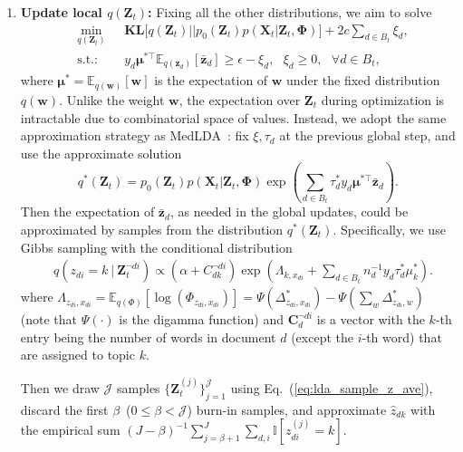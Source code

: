 \documentclass[twoside,11pt]{article}
\newcommand{\Xv}{\bm{X}}
\newcommand{\zv}{\bm{z}}
\newcommand{\Zv}{\bm{Z}}
\newcommand{\wv}{\bm{w}}
\newcommand{\Phiv}{\bm{\Phi}}
\newcommand{\muv}{\bm \mu}
\newcommand{\ep}{\mathbb{E}}
\newcommand{\KL}{\textbf{KL}}
\newcommand{\barzv}{\bm{\bar{z}}}
\newcommand{\subto}{\text{s.t.:}}
\newcommand{\ind}{\mathbb{I}}
\newcommand\refeq[1]{(\ref{#1})}
\begin{document}
\begin{enumerate}
\item \textbf{Update local $q(\Zv_t)$:} Fixing all the other distributions, we aim to solve
\setlength\arraycolsep{0 pt}\begin{eqnarray*}
&\underset{q(\Zv_t)}{\operatorname{min}}~~~ & \KL\Big[q(\Zv_t) || p_0(\Zv_t) p(\Xv_t | \Zv_t, \Phiv)\Big] + 2c \sum\limits_{d \in B_t}{\xi_d}, \\
&\subto & y_d \muv^{*\top} \ep_{q(\zv_d)}[\barzv_d] \geq \epsilon-\xi_d, ~~~ \xi_d \geq 0, ~~~\forall d \in B_t,
\end{eqnarray*}
where $\muv^* = \ep_{q(\wv)}[\wv]$ is the expectation of $\wv$ under the fixed distribution $q(\wv)$. Unlike the weight $\wv$, the expectation over $\Zv_t$ during optimization is intractable due to combinatorial space of values. Instead, we adopt the same approximation strategy as MedLDA~\citep{zhu2012medlda}: fix $\xi, \tau_d$ at the previous global step, and use the approximate solution
\begin{equation*}
q^*(\Zv_t) = p_0(\Zv_t) p(\Xv_t | \Zv_t, \Phiv) \exp\left( \sum\limits_{d \in B_t}{\tau_d^* y_d \muv^{*\top} \barzv_d} \right).
\end{equation*}
Then the expectation of $\barzv_d$, as needed in the global updates, could be approximated by samples from the distribution $q^*(\Zv_t)$. Specifically, we use Gibbs sampling with the conditional distribution
\begin{equation}\label{eq:lda_sample_z_ave}
\begin{array}{rl}
&q(z_{di} =  k ~|~ \Zv_t^{\neg di}) \propto  \left( \alpha + C_{dk}^{\neg di} \right)
\exp\left( \Lambda_{k,x_{di}} +\sum\limits_{d \in B_t}{n_d^{-1} y_d \tau_d^* \mu^*_k} \right).
\end{array}
\end{equation}
where $\Lambda_{z_{di}, x_{di}} = \ep_{q(\Phi)}[\log(\Phi_{z_{di}, x_{di}})] = \Psi(\Delta_{z_{di}, x_{di}}^*)-\Psi(\sum_{w}{\Delta_{z_{di}, w}^*})$ (note that $\Psi(\cdot)$ is the digamma function) and $\bm{C}_d^{\neg di}$ is a vector with the $k$-th entry being the number of words in document $d$ (except the $i$-th word) that are assigned to topic $k$.


Then we draw $\mathcal{J}$ samples $\{\Zv_t^{(j)}\}_{j=1}^{\mathcal{J}}$ using Eq.~\refeq{eq:lda_sample_z_ave}, discard the first $\beta$~($0 \leq \beta < \mathcal{J}$) burn-in samples, and approximate $\widehat{z}_{dk}$ with the empirical sum  $(J-\beta)^{-1} \sum_{j = \beta+1}^{J}{\sum_{d, i} \ind[z_{di}^{(j)} = k]}$.
\end{enumerate}
\end{document}
